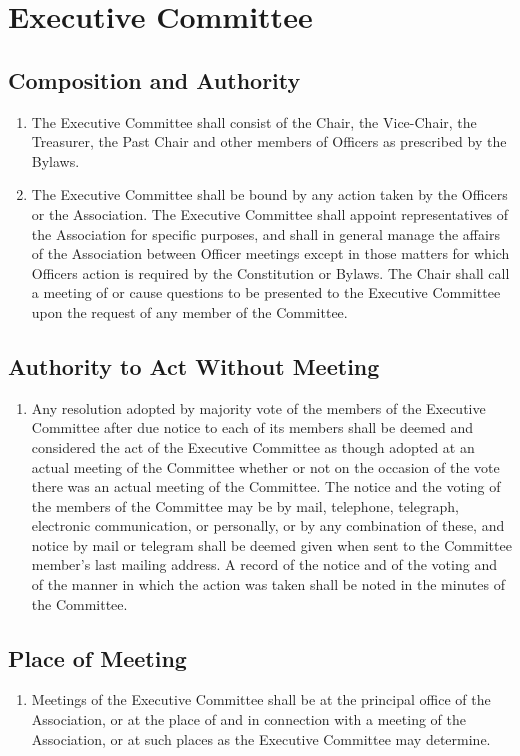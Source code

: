 \section{Executive Committee}

\subsection{Composition and Authority}
\begin{enumerate}
	\item The Executive Committee shall consist of the Chair, the Vice-Chair, the Treasurer, the Past Chair and other members of Officers as prescribed by the Bylaws.
	\item The Executive Committee shall be bound by any action taken by the Officers or the Association. The Executive Committee shall appoint representatives of the Association for specific purposes, and shall in general manage the affairs of the Association between Officer meetings except in those matters for which Officers action is required by the Constitution or Bylaws. The Chair shall call a meeting of or cause questions to be presented to the Executive Committee upon the request of any member of the Committee.
\end{enumerate}

\subsection{Authority to Act Without Meeting}
\begin{enumerate}
	\item Any resolution adopted by majority vote of the members of the Executive Committee after due notice to each of its members shall be deemed and considered the act of the Executive Committee as though adopted at an actual meeting of the Committee whether or not on the occasion of the vote there was an actual meeting of the Committee. The notice and the voting of the members of the Committee may be by mail, telephone, telegraph, electronic communication, or personally, or by any combination of these, and notice by mail or telegram shall be deemed given when sent to the Committee member's last mailing address. A record of the notice and of the voting and of the manner in which the action was taken shall be noted in the minutes of the Committee.
\end{enumerate}

\subsection{Place of Meeting}
\begin{enumerate}
	\item Meetings of the Executive Committee shall be at the principal office of the Association, or at the place of and in connection with a meeting of the Association, or at such places as the Executive Committee may determine.
\end{enumerate}

